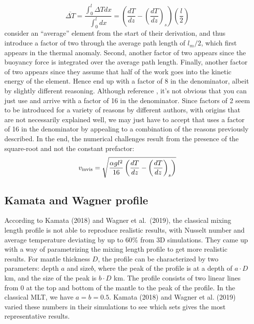 \begin{equation}
\overline{\Delta T} = \frac{\int_0^l \Delta T dx}{\int_0^l dx} = \left( \frac{dT}{dz} - \left( \frac{dT}{dz} \right)_s \right) \left( \frac{l}{2} \right)
\end{equation}
\cite{KWW12} consider an ``average'' element from the start of their derivation, and thus introduce a factor of two through the average path length of $l_m/2$, which first appears in the thermal anomaly.  Second, another factor of two appears since the buoyancy force is integrated over the average path length.  Finally, another factor of two appears since they assume that half of the work goes into the kinetic energy of the element.  Hence \cite{KWW12} end up with a factor of 8 in the denominator, albeit by slightly different reasoning.  Although \cite{ABE93,ABE95} reference \cite{V53}, it's not obvious that you can just use \cite{V53} and arrive with a factor of 16 in the denominator.  Since factors of 2 seem to be introduced for a variety of reasons by different authors, with origins that are not necessarily explained well, we may just have to accept that \cite{ABE93,ABE95} uses a factor of 16 in the denominator by appealing to a combination of the reasons previously described.  In the end, the numerical challenges result from the presence of the square-root and not the constant prefactor:
\begin{equation}
v_{\rm invis} = \sqrt{\frac{\alpha g l^2}{16} \left( \frac{dT}{dz} - \left( \frac{dT}{dz} \right)_s \right)}
\end{equation}

\subsection{Kamata and Wagner profile}
According to Kamata (2018) and Wagner et al.\ (2019), the classical mixing length profile is not able to reproduce realistic results, with Nusselt number and average temperature deviating by up to 60\% from 3D simulations. They came up with a way of parametrizing the mixing length profile to get more realistic results. For mantle thickness $D$, the profile can be characterized by two parameters: depth $a$ and size$b$, where the peak of the profile is at a depth of $a\cdot D$ km, and the size of the peak is $b \cdot D$ km. The profile consists of two linear lines from 0 at the top and bottom of the mantle to the peak of the profile. In the classical MLT, we have $a=b=0.5$. Kamata (2018) and Wagner et al. (2019) varied these numbers in their simulations to see which sets gives the most representative results.

